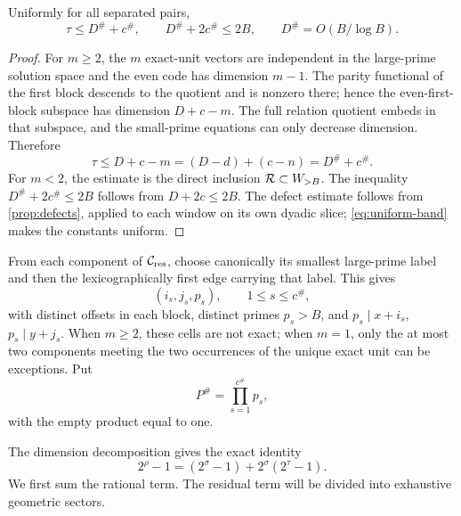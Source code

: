 \begin{lemma}\label{macro:lem:quotient-core}
Uniformly for all separated pairs,
\[
 \tau\leq D^\#+c^\#,
 \qquad D^\#+2c^\#\leq2B,
 \qquad D^\#=O(B/\log B).
\]
\end{lemma}

\begin{proof}
For $m\geq2$, the $m$ exact-unit vectors are independent in the
large-prime solution space and the even code has dimension $m-1$.
The parity functional of the first block descends to the quotient and
is nonzero there; hence the even-first-block subspace has dimension
$D+c-m$.  The full relation quotient embeds in that subspace, and the
small-prime equations can only decrease dimension.  Therefore
\[
 \tau\leq D+c-m=(D-d)+(c-n)=D^\#+c^\#.
\]
For $m<2$, the estimate is the direct inclusion
$\mathcal R\subset W_{>B}$.  The inequality
$D^\#+2c^\#\leq2B$ follows from $D+2c\leq2B$.  The defect estimate follows from \cref{prop:defects}, applied to each
window on its own dyadic slice; \eqref{eq:uniform-band} makes the constants
uniform.
\end{proof}

From each component of $\mathcal C_{\mathrm{res}}$, choose canonically its smallest
large-prime label and then the lexicographically first edge carrying
that label.  This gives
\[
 (i_s,j_s,p_s),\qquad 1\leq s\leq c^\#,
\]
with distinct offsets in each block, distinct primes $p_s>B$, and
$p_s\mid x+i_s$, $p_s\mid y+j_s$.  When $m\geq2$, these cells are not
exact; when $m=1$, only the at most two components meeting the two
occurrences of the unique exact unit can be exceptions.  Put
\[
 P^\#=\prod_{s=1}^{c^\#}p_s,
\]
with the empty product equal to one.


The dimension decomposition gives the exact identity
\begin{equation}\label{eq:weight-split}
 2^\rho-1=(2^\sigma-1)+2^\sigma(2^\tau-1).
\end{equation}
We first sum the rational term. The residual term will be divided into
exhaustive geometric sectors.

